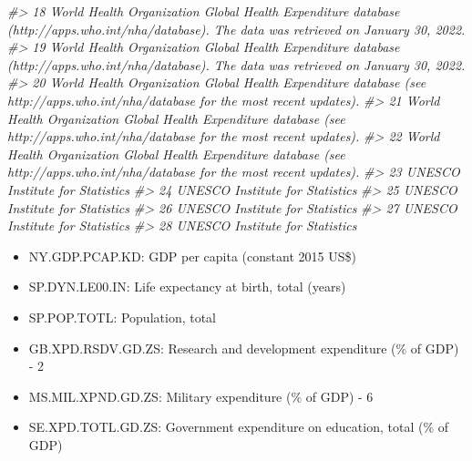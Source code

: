 \documentclass[
  xelatex, ja=standard]{bxjsbook}
\newenvironment{Shaded}{\begin{snugshade}}{\end{snugshade}}
\newcommand{\CommentTok}[1]{\textcolor[rgb]{0.56,0.35,0.01}{\textit{#1}}}
\theoremstyle{definition}
\theoremstyle{definition}
\theoremstyle{definition}
\theoremstyle{definition}
\theoremstyle{remark}
\begin{document}
\begin{Shaded}
\begin{Highlighting}[]
\CommentTok{\#\textgreater{} 18  World Health Organization Global Health Expenditure database (http://apps.who.int/nha/database). The data was retrieved on January 30, 2022.}
\CommentTok{\#\textgreater{} 19  World Health Organization Global Health Expenditure database (http://apps.who.int/nha/database). The data was retrieved on January 30, 2022.}
\CommentTok{\#\textgreater{} 20              World Health Organization Global Health Expenditure database (see http://apps.who.int/nha/database for the most recent updates).}
\CommentTok{\#\textgreater{} 21              World Health Organization Global Health Expenditure database (see http://apps.who.int/nha/database for the most recent updates).}
\CommentTok{\#\textgreater{} 22              World Health Organization Global Health Expenditure database (see http://apps.who.int/nha/database for the most recent updates).}
\CommentTok{\#\textgreater{} 23                                                                                                               UNESCO Institute for Statistics}
\CommentTok{\#\textgreater{} 24                                                                                                               UNESCO Institute for Statistics}
\CommentTok{\#\textgreater{} 25                                                                                                               UNESCO Institute for Statistics}
\CommentTok{\#\textgreater{} 26                                                                                                               UNESCO Institute for Statistics}
\CommentTok{\#\textgreater{} 27                                                                                                               UNESCO Institute for Statistics}
\CommentTok{\#\textgreater{} 28                                                                                                               UNESCO Institute for Statistics}
\end{Highlighting}
\end{Shaded}

\begin{itemize}
\item
  NY.GDP.PCAP.KD: GDP per capita (constant 2015 US\$)
\item
  SP.DYN.LE00.IN: Life expectancy at birth, total (years)
\item
  SP.POP.TOTL: Population, total
\item
  GB.XPD.RSDV.GD.ZS: Research and development expenditure (\% of GDP) - 2
\item
  MS.MIL.XPND.GD.ZS: Military expenditure (\% of GDP) - 6
\item
  SE.XPD.TOTL.GD.ZS: Government expenditure on education, total (\% of GDP)
\end{itemize}
\end{document}
